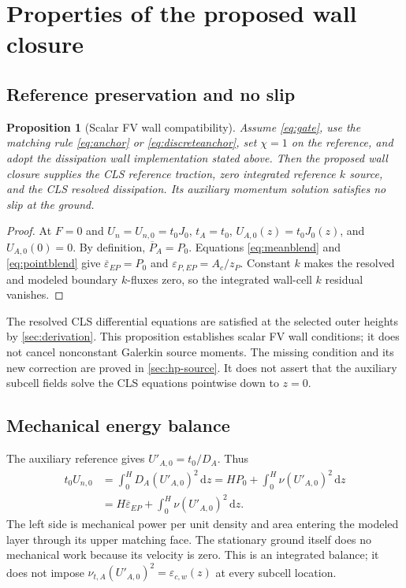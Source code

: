 \documentclass[11pt,a4paper]{article}
\numberwithin{equation}{section}
\newtheorem{proposition}{Proposition}[section]
\newcommand{\dd}{\mathrm{d}}
\newcommand{\eps}{\varepsilon}
\newcommand{\avg}[1]{\overline{#1}}
\newcommand{\Aref}{A_c}
\newcommand{\ECw}{\eps_{c,w}}
\begin{document}
\section{Properties of the proposed wall closure}
\label{sec:properties}
\subsection{Reference preservation and no slip}
\begin{proposition}[Scalar FV wall compatibility]
Assume \cref{eq:gate}, use the matching rule
\cref{eq:anchor} or \cref{eq:discreteanchor}, set $\chi=1$ on the
reference, and adopt the dissipation wall implementation stated above.
Then the proposed wall closure supplies the CLS reference traction,
zero integrated reference $k$ source, and the CLS resolved dissipation.
Its auxiliary momentum solution satisfies no slip at the ground.
\end{proposition}
\begin{proof}
At $F=0$ and $U_n=U_{n,0}=t_0J_0$,
$t_A=t_0$, $U_{A,0}(z)=t_0J_0(z)$, and $U_{A,0}(0)=0$.
By definition, $\avg P_A=P_0$. Equations
\eqref{eq:meanblend} and \eqref{eq:pointblend} give
$\avg\eps_{EP}=P_0$ and $\eps_{P,EP}=\Aref/z_P$.
Constant $k$ makes the resolved and modeled boundary $k$-fluxes zero, so
the integrated wall-cell $k$ residual vanishes.
\end{proof}
The resolved CLS differential equations are satisfied at the selected
outer heights by \cref{sec:derivation}. This proposition establishes
scalar FV wall conditions; it does not cancel nonconstant Galerkin
source moments. The missing condition and its new correction are proved
in \cref{sec:hp-source}. It does not assert that the auxiliary
subcell fields solve the CLS equations pointwise down to $z=0$.

\subsection{Mechanical energy balance}
The auxiliary reference gives $U'_{A,0}=t_0/D_A$. Thus
\begin{align}
t_0U_{n,0}
 &=\int_0^H D_A(U'_{A,0})^2\,\dd z
 =HP_0+\int_0^H\nu(U'_{A,0})^2\,\dd z
\nonumber\\
 &=\boxed{H\avg\eps_{EP}
       +\int_0^H\nu(U'_{A,0})^2\,\dd z.}
\label{eq:energy}
\end{align}
The left side is mechanical power per unit density and area entering the
modeled layer through its upper matching face. The stationary ground
itself does no mechanical work because its velocity is zero.
This is an integrated balance; it does not impose
$\nu_{t,A}(U'_{A,0})^2=\ECw(z)$ at every subcell location.
\end{document}
